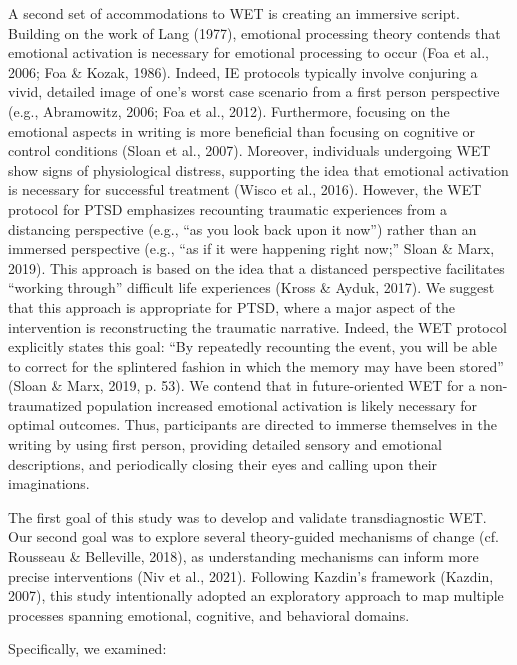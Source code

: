 \documentclass[
  man,floatsintext]{apa7}
\begin{document}
A second set of accommodations to WET is creating an immersive script.
Building on the work of Lang (1977), emotional processing theory contends that
emotional activation is necessary for emotional processing to occur (Foa et al., 2006; Foa \& Kozak, 1986).
Indeed, IE protocols typically involve conjuring a vivid, detailed image of one's worst case scenario from a first person perspective (e.g., Abramowitz, 2006; Foa et al., 2012).
Furthermore, focusing on the emotional aspects in writing is more beneficial than focusing on cognitive or control conditions (Sloan et al., 2007).
Moreover, individuals undergoing WET show signs of physiological distress, supporting the idea that emotional activation is necessary for successful treatment (Wisco et al., 2016).
However, the WET protocol for PTSD emphasizes recounting traumatic experiences from a distancing perspective (e.g., ``as you look back upon it now'') rather than an immersed perspective (e.g., ``as if it were happening right now;'' Sloan \& Marx, 2019).
This approach is based on the idea that a distanced perspective facilitates ``working through'' difficult life experiences (Kross \& Ayduk, 2017).
We suggest that this approach is appropriate for PTSD, where a major aspect of the intervention is reconstructing the traumatic narrative.
Indeed, the WET protocol explicitly states this goal: ``By repeatedly recounting the event, you will be able to correct for the splintered fashion in which the memory may have been stored'' (Sloan \& Marx, 2019, p. 53).
We contend that in future-oriented WET for a non-traumatized population increased emotional activation is likely necessary for optimal outcomes.
Thus, participants are directed to immerse themselves in the writing by using first person, providing detailed sensory and emotional descriptions, and periodically closing their eyes and calling upon their imaginations.

The first goal of this study was to develop and validate transdiagnostic WET.
Our second goal was to explore several theory-guided mechanisms of change (cf. Rousseau \& Belleville, 2018), as understanding mechanisms can inform more precise interventions (Niv et al., 2021).
Following Kazdin's framework (Kazdin, 2007), this study intentionally adopted an exploratory approach to map multiple processes spanning emotional, cognitive, and behavioral domains.

Specifically, we examined:
\end{document}
